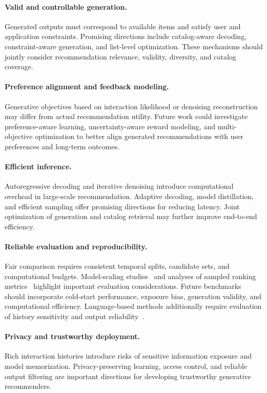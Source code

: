 \documentclass[sigconf,nonacm]{acmart}
\begin{document}
\paragraph{Valid and controllable generation.}
Generated outputs must correspond to available items
and satisfy user and application constraints.
Promising directions include catalog-aware decoding,
constraint-aware generation, and list-level optimization.
These mechanisms should jointly consider recommendation
relevance, validity, diversity, and catalog coverage.

\paragraph{Preference alignment and feedback modeling.}
Generative objectives based on interaction likelihood
or denoising reconstruction may differ from actual
recommendation utility. Future work could investigate
preference-aware learning, uncertainty-aware reward
modeling, and multi-objective optimization to better
align generated recommendations with user preferences
and long-term outcomes.

\paragraph{Efficient inference.}
Autoregressive decoding and iterative denoising introduce
computational overhead in large-scale recommendation.
Adaptive decoding, model distillation, and efficient
sampling offer promising directions for reducing latency.
Joint optimization of generation and catalog retrieval
may further improve end-to-end efficiency.

\paragraph{Reliable evaluation and reproducibility.}
Fair comparison requires consistent temporal splits,
candidate sets, and computational budgets.
Model-scaling studies~\cite{scaling} and analyses of
sampled ranking metrics~\cite{samplemetrics} highlight
important evaluation considerations. Future benchmarks
should incorporate cold-start performance, exposure bias,
generation validity, and computational efficiency.
Language-based methods additionally require evaluation
of history sensitivity and output reliability~\cite{beyondutility}.

\paragraph{Privacy and trustworthy deployment.}
Rich interaction histories introduce risks of sensitive
information exposure and model memorization.
Privacy-preserving learning, access control, and
reliable output filtering are important directions
for developing trustworthy generative recommenders.
\end{document}
